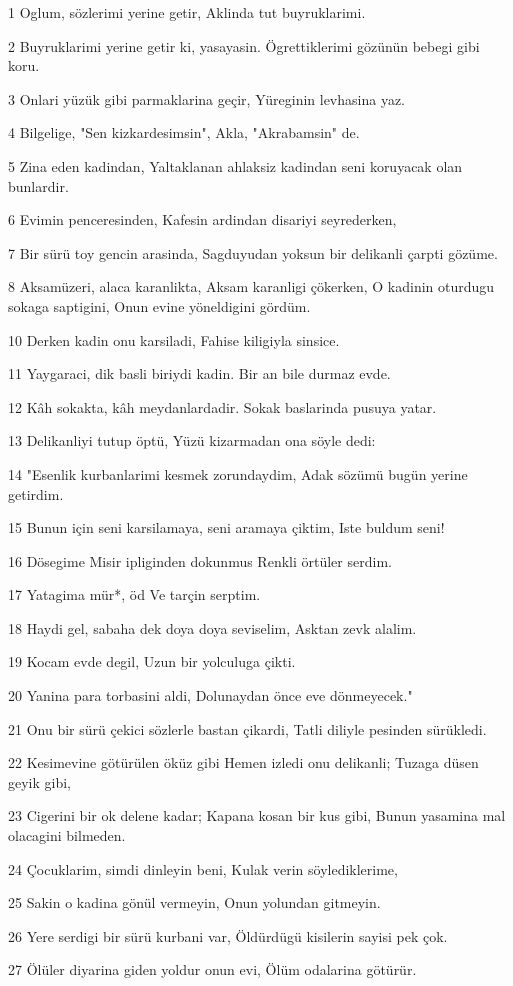 \par 1 Oglum, sözlerimi yerine getir, Aklinda tut buyruklarimi.
\par 2 Buyruklarimi yerine getir ki, yasayasin. Ögrettiklerimi gözünün bebegi gibi koru.
\par 3 Onlari yüzük gibi parmaklarina geçir, Yüreginin levhasina yaz.
\par 4 Bilgelige, "Sen kizkardesimsin", Akla, "Akrabamsin" de.
\par 5 Zina eden kadindan, Yaltaklanan ahlaksiz kadindan seni koruyacak olan bunlardir.
\par 6 Evimin penceresinden, Kafesin ardindan disariyi seyrederken,
\par 7 Bir sürü toy gencin arasinda, Sagduyudan yoksun bir delikanli çarpti gözüme.
\par 8 Aksamüzeri, alaca karanlikta, Aksam karanligi çökerken, O kadinin oturdugu sokaga saptigini, Onun evine yöneldigini gördüm.
\par 10 Derken kadin onu karsiladi, Fahise kiligiyla sinsice.
\par 11 Yaygaraci, dik basli biriydi kadin. Bir an bile durmaz evde.
\par 12 Kâh sokakta, kâh meydanlardadir. Sokak baslarinda pusuya yatar.
\par 13 Delikanliyi tutup öptü, Yüzü kizarmadan ona söyle dedi:
\par 14 "Esenlik kurbanlarimi kesmek zorundaydim, Adak sözümü bugün yerine getirdim.
\par 15 Bunun için seni karsilamaya, seni aramaya çiktim, Iste buldum seni!
\par 16 Dösegime Misir ipliginden dokunmus Renkli örtüler serdim.
\par 17 Yatagima mür*, öd Ve tarçin serptim.
\par 18 Haydi gel, sabaha dek doya doya seviselim, Asktan zevk alalim.
\par 19 Kocam evde degil, Uzun bir yolculuga çikti.
\par 20 Yanina para torbasini aldi, Dolunaydan önce eve dönmeyecek."
\par 21 Onu bir sürü çekici sözlerle bastan çikardi, Tatli diliyle pesinden sürükledi.
\par 22 Kesimevine götürülen öküz gibi Hemen izledi onu delikanli; Tuzaga düsen geyik gibi,
\par 23 Cigerini bir ok delene kadar; Kapana kosan bir kus gibi, Bunun yasamina mal olacagini bilmeden.
\par 24 Çocuklarim, simdi dinleyin beni, Kulak verin söylediklerime,
\par 25 Sakin o kadina gönül vermeyin, Onun yolundan gitmeyin.
\par 26 Yere serdigi bir sürü kurbani var, Öldürdügü kisilerin sayisi pek çok.
\par 27 Ölüler diyarina giden yoldur onun evi, Ölüm odalarina götürür.

